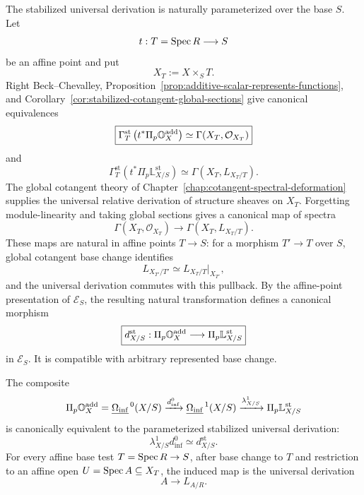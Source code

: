 \begin{construction}
\label{constr:stabilized-universal-derivation}
The stabilized universal derivation is naturally parameterized over the base \(S\).  Let
\[
    t:T=\operatorname{Spec} R\longrightarrow S
\]
be an affine point and put
\[
    X_T:=X\times_ST.
\]
Right Beck--Chevalley, Proposition~\ref{prop:additive-scalar-represents-functions}, and
Corollary~\ref{cor:stabilized-cotangent-global-sections} give canonical equivalences
\[
\boxed{
    \Gamma_T^{\mathrm{st}}
    \left(
        t^*\Pi_p\mathbb O_X^{\mathrm{add}}
    \right)
    \simeq
    \Gamma(X_T,\mathcal O_{X_T})
}
\]
and
\[
\boxed{
    \Gamma_T^{\mathrm{st}}
    \left(
        t^*\Pi_p\mathbb L^{\mathrm{st}}_{X/S}
    \right)
    \simeq
    \Gamma(X_T,L_{X_T/T}).
}
\]
The global cotangent theory of Chapter~\ref{chap:cotangent-spectral-deformation} supplies the
universal relative derivation of structure sheaves on \(X_T\).  Forgetting module-linearity and
taking global sections gives a canonical map of spectra
\[
    \Gamma(X_T,\mathcal O_{X_T})
    \longrightarrow
    \Gamma(X_T,L_{X_T/T}).
\]
These maps are natural in affine points \(T\to S\): for a morphism \(T'\to T\) over \(S\),
global cotangent base change identifies
\[
    L_{X_{T'}/T'}
    \simeq
    L_{X_T/T}|_{X_{T'}},
\]
and the universal derivation commutes with this pullback.  By the affine-point presentation of
\(\mathcal E_S\), the resulting natural transformation defines a canonical morphism
\[
\boxed{
    d^{\mathrm{st}}_{X/S}:
    \Pi_p\mathbb O_X^{\mathrm{add}}
    \longrightarrow
    \Pi_p\mathbb L^{\mathrm{st}}_{X/S}
}
\]
in \(\mathcal E_S\).  It is compatible with arbitrary represented base change.
\end{construction}

\begin{theorem}
\label{thm:infinitesimal-differential-linearizes}
The composite
\[
    \Pi_p\mathbb O_X^{\mathrm{add}}
    =
    \underline{\Omega_{\mathrm{inf}}}^{\,0}(X/S)
    \xrightarrow{d_{\inf}^0}
    \underline{\Omega_{\mathrm{inf}}}^{\,1}(X/S)
    \xrightarrow{\lambda^1_{X/S}}
    \Pi_p\mathbb L^{\mathrm{st}}_{X/S}
\]
is canonically equivalent to the parameterized stabilized universal derivation:
\[
\boxed{
    \lambda^1_{X/S}d_{\inf}^0
    \simeq
    d^{\mathrm{st}}_{X/S}.
}
\]
For every affine base test \(T=\operatorname{Spec} R\to S\), after base change to \(T\) and restriction to an
affine open \(U=\operatorname{Spec} A\subseteq X_T\), the induced map is the universal derivation
\[
\boxed{
    A\longrightarrow L_{A/R}.
}
\]
\end{theorem}

